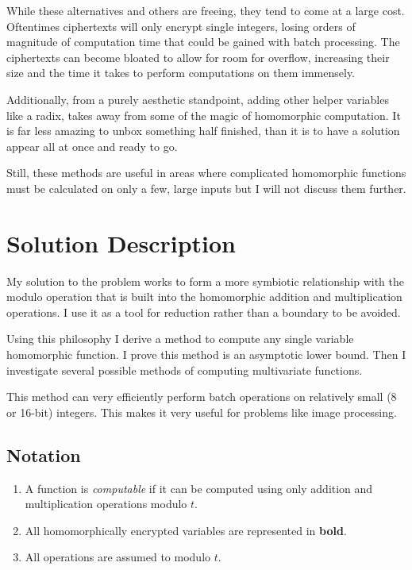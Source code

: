 \documentclass{article}
\begin{document}
        While these alternatives and others are freeing, they tend to come at a large cost.
        Oftentimes ciphertexts will only encrypt single integers, 
        losing orders of magnitude of computation time that could be gained with batch processing.
        The ciphertexts can become bloated to allow for room for overflow, increasing their size and the time it takes to perform computations on them immensely.

        Additionally, from a purely aesthetic standpoint, adding other helper variables 
        like a radix, 
        takes away from some of the magic of homomorphic computation. 
        It is far less amazing to unbox something half finished,
        than it is to have a solution appear all at once and ready to go.

        Still, these methods are useful in areas where complicated homomorphic functions must be calculated on only a few, large inputs but I will not discuss them further.

    \section{Solution Description}

        My solution to the problem works to form
        a more symbiotic relationship with the modulo operation that is built into the homomorphic addition and multiplication operations.
        I use it as a tool for reduction rather than a boundary to be avoided.

        Using this philosophy I derive a method to compute any single variable homomorphic function. 
        I prove this method is an asymptotic lower bound.
        Then I investigate several possible methods of computing multivariate functions.

        This method can very efficiently perform batch operations on relatively small 
        (8 or 16-bit) integers. 
        This makes it very useful for problems like image processing.

    \subsection{Notation}
        \begin{enumerate}[-]
            \item
                A function is \emph{computable} if it can be computed using only addition and multiplication operations modulo $t$.
            \item
                All homomorphically encrypted variables are represented in \textbf{bold}.
            \item
                All operations are assumed to modulo $t$.
        \end{enumerate}
\end{document}
